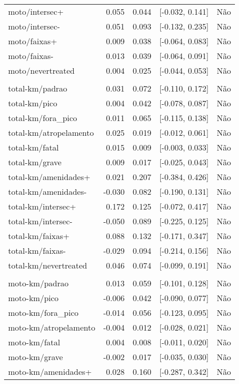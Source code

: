 \begin{longtable}{lrrcl}
moto/intersec+ & 0.055 & 0.044 & {}[-0.032, 0.141] & Não\\
moto/intersec- & 0.051 & 0.093 & {}[-0.132, 0.235] & Não\\
moto/faixas+ & 0.009 & 0.038 & {}[-0.064, 0.083] & Não\\
moto/faixas- & 0.013 & 0.039 & {}[-0.064, 0.091] & Não\\
moto/nevertreated & 0.004 & 0.025 & {}[-0.044, 0.053] & Não\\
 &  &  &  & \\
total-km/padrao & 0.031 & 0.072 & {}[-0.110, 0.172] & Não\\
total-km/pico & 0.004 & 0.042 & {}[-0.078, 0.087] & Não\\
total-km/fora\_pico & 0.011 & 0.065 & {}[-0.115, 0.138] & Não\\
total-km/atropelamento & 0.025 & 0.019 & {}[-0.012, 0.061] & Não\\
total-km/fatal & 0.015 & 0.009 & {}[-0.003, 0.033] & Não\\
total-km/grave & 0.009 & 0.017 & {}[-0.025, 0.043] & Não\\
total-km/amenidades+ & 0.021 & 0.207 & {}[-0.384, 0.426] & Não\\
total-km/amenidades- & -0.030 & 0.082 & {}[-0.190, 0.131] & Não\\
total-km/intersec+ & 0.172 & 0.125 & {}[-0.072, 0.417] & Não\\
total-km/intersec- & -0.050 & 0.089 & {}[-0.225, 0.125] & Não\\
total-km/faixas+ & 0.088 & 0.132 & {}[-0.171, 0.347] & Não\\
total-km/faixas- & -0.029 & 0.094 & {}[-0.214, 0.156] & Não\\
total-km/nevertreated & 0.046 & 0.074 & {}[-0.099, 0.191] & Não\\
 &  &  &  & \\
moto-km/padrao & 0.013 & 0.059 & {}[-0.101, 0.128] & Não\\
moto-km/pico & -0.006 & 0.042 & {}[-0.090, 0.077] & Não\\
moto-km/fora\_pico & -0.014 & 0.056 & {}[-0.123, 0.095] & Não\\
moto-km/atropelamento & -0.004 & 0.012 & {}[-0.028, 0.021] & Não\\
moto-km/fatal & 0.004 & 0.008 & {}[-0.011, 0.020] & Não\\
moto-km/grave & -0.002 & 0.017 & {}[-0.035, 0.030] & Não\\
moto-km/amenidades+ & 0.028 & 0.160 & {}[-0.287, 0.342] & Não\\

\end{longtable}
